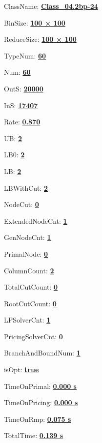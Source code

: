 \documentclass[11pt]{article}
\begin{document}
\pagestyle{empty}


ClassName: \underline{\textbf{Class_04.2bp-24}}
\par
BinSize: \underline{\textbf{100 × 100}}
\par
ReduceSize: \underline{\textbf{100 × 100}}
\par
TypeNum: \underline{\textbf{60}}
\par
Num: \underline{\textbf{60}}
\par
OutS: \underline{\textbf{20000}}
\par
InS: \underline{\textbf{17407}}
\par
Rate: \underline{\textbf{0.870}}
\par
UB: \underline{\textbf{2}}
\par
LB0: \underline{\textbf{2}}
\par
LB: \underline{\textbf{2}}
\par
LBWithCut: \underline{\textbf{2}}
\par
NodeCut: \underline{\textbf{0}}
\par
ExtendedNodeCnt: \underline{\textbf{1}}
\par
GenNodeCnt: \underline{\textbf{1}}
\par
PrimalNode: \underline{\textbf{0}}
\par
ColumnCount: \underline{\textbf{2}}
\par
TotalCutCount: \underline{\textbf{0}}
\par
RootCutCount: \underline{\textbf{0}}
\par
LPSolverCnt: \underline{\textbf{1}}
\par
PricingSolverCnt: \underline{\textbf{0}}
\par
BranchAndBoundNum: \underline{\textbf{1}}
\par
isOpt: \underline{\textbf{true}}
\par
TimeOnPrimal: \underline{\textbf{0.000 s}}
\par
TimeOnPricing: \underline{\textbf{0.000 s}}
\par
TimeOnRmp: \underline{\textbf{0.075 s}}
\par
TotalTime: \underline{\textbf{0.139 s}}
\par
\newpage
\end{document}
